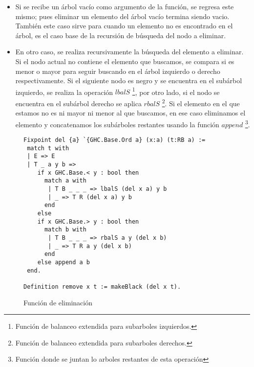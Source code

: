 \begin{itemize}
    \item Si se recibe un \'arbol vacío como argumento de la funci\'on, se regresa este mismo; pues
    eliminar un elemento del \'arbol vacío termina siendo vacio. También este caso sirve para
    cuando un elemento no es encontrado en el \'arbol, es el caso base de la recursi\'on de
    búsqueda del nodo a eliminar.
    \item En otro caso, se realiza recursivamente la búsqueda del elemento a eliminar. Si el nodo
    actual no contiene el elemento que buscamos, se compara si es menor o mayor para seguir
    buscando en el \'arbol izquierdo o derecho respectivamente. Si el siguiente nodo es negro y se
    encuentra en el sub\'arbol izquierdo, se realiza la operaci\'on $lbalS$ \footnote{Funci\'on de
    balanceo extendida para subarboles izquierdos.}, por otro lado, si el nodo se encuentra en el
    sub\'arbol derecho se aplica $rbalS$ \footnote{Funci\'on de balanceo extendida para subarboles
    derechos.}. Si el elemento en el que estamos no es ni mayor ni menor al que buscamos, en ese
    caso eliminamos el elemento y concatenamos los subárboles restantes usando la función $append$
    \footnote{Funci\'on donde se juntan lo arboles restantes de esta operaci\'on}.
\end{itemize}

\begin{figure}
\centering
\captionsetup{justification=centering}
\begin{verbatim}
Fixpoint del {a} `{GHC.Base.Ord a} (x:a) (t:RB a) :=
 match t with
 | E => E
 | T _ a y b =>
    if x GHC.Base.< y : bool then
      match a with
       | T B _ _ _ => lbalS (del x a) y b
       | _ => T R (del x a) y b
      end
    else
    if x GHC.Base.> y : bool then
      match b with
       | T B _ _ _ => rbalS a y (del x b)
       | _ => T R a y (del x b)
      end
    else append a b
 end.

Definition remove x t := makeBlack (del x t).
\end{verbatim}
\caption{Función de eliminación}
\label{func_del}
\end{figure}


